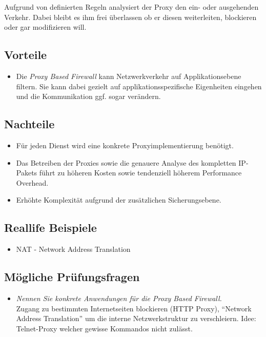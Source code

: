 Aufgrund von definierten Regeln analysiert der Proxy den ein- oder ausgehenden Verkehr. Dabei bleibt es ihm frei überlassen ob er diesen weiterleiten, blockieren oder gar modifizieren will.

\subsection*{Vorteile}
\begin{itemize}
	\item Die \emph{Proxy Based Firewall} kann Netzwerkverkehr auf Applikationsebene filtern. Sie kann dabei gezielt auf applikationsspezifische Eigenheiten eingehen und die Kommunikation ggf. sogar verändern.
\end{itemize}

\subsection*{Nachteile}
\begin{itemize}
	\item Für jeden Dienst wird eine konkrete Proxyimplementierung benötigt.
	\item Das Betreiben der Proxies sowie die genauere Analyse des kompletten IP-Pakets führt zu höheren Kosten sowie tendenziell höherem Performance Overhead.
	\item Erhöhte Komplexität aufgrund der zusätzlichen Sicherungsebene.
\end{itemize}


\subsection*{Reallife Beispiele}
\begin{itemize}
	\item NAT - Network Address Translation
\end{itemize}

\subsection*{Mögliche Prüfungsfragen}
\begin{itemize}
	\item \emph{Nennen Sie konkrete Anwendungen für die Proxy Based Firewall.}\\
	Zugang zu bestimmten Internetseiten blockieren (HTTP Proxy), ``Network Address Translation'' um die interne Netzwerkstruktur zu verschleiern. Idee: Telnet-Proxy welcher gewisse Kommandos nicht zulässt.
\end{itemize}